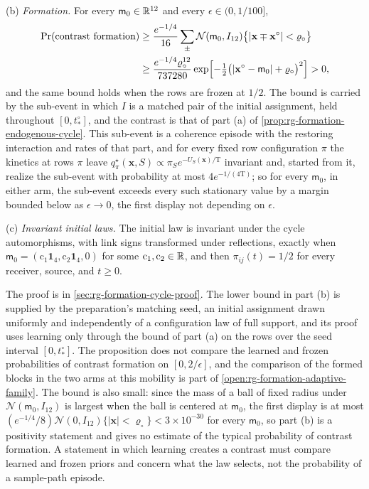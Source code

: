 (b) \emph{Formation.} For every \(\mathsf m_0\in\mathbb R^{12}\) and every
\(\epsilon\in(0,1/100]\),
\[
\begin{aligned}
\Pr(\text{contrast formation})
&\ge\frac{e^{-1/4}}{16}\sum_{\pm}\mathcal N(\mathsf m_0,I_{12})
\bigl\{|\mathbf x\mp\mathbf x^\circ|<\varrho_\circ\bigr\}\\
&\ge\frac{e^{-1/4}\varrho_\circ^{12}}{737280}
\exp\Bigl[-\tfrac12\bigl(|\mathbf x^\circ-\mathsf m_0|+\varrho_\circ\bigr)^2\Bigr]>0,
\end{aligned}
\]
and the same bound holds when the rows are frozen at \(1/2\). The bound is
carried by the sub-event in which \(I\) is a matched pair of the initial
assignment, held throughout \([0,t^\circ_*]\), and the contrast is that of
part (a) of \cref{prop:rg-formation-endogenous-cycle}. This sub-event is a
coherence episode with the restoring interaction and rates of that part, and
for every fixed row configuration \(\pi\) the kinetics at rows \(\pi\) leave
\(q^\star_\pi(\mathbf x,S)\propto\pi_Se^{-U_S(\mathbf x)/\mathrm T}\) invariant
and, started from it, realize the sub-event with probability at most
\(4e^{-1/(4\mathrm T)}\); so for every \(\mathsf m_0\), in either arm, the
sub-event exceeds every such stationary value by a margin bounded below as
\(\epsilon\to0\), the first display not depending on \(\epsilon\).

(c) \emph{Invariant initial laws.} The initial law is invariant under the cycle
automorphisms, with link signs transformed under reflections, exactly when
\(\mathsf m_0=(\mathrm c_1\mathbf 1_4,\mathrm c_2\mathbf 1_4,0)\) for some
\(\mathrm c_1,\mathrm c_2\in\mathbb R\), and then \(\pi_{ij}(t)=1/2\) for every
receiver, source, and \(t\ge0\).

The proof is in \cref{sec:rg-formation-cycle-proof}. The lower bound in part (b)
is supplied by the preparation's matching seed, an initial assignment drawn
uniformly and independently of a configuration law of full support, and its
proof uses learning only through the bound of part (a) on the rows over the
seed interval \([0,t^\circ_*]\). The proposition does not compare the learned
and frozen probabilities of contrast formation on \([0,2/\epsilon]\), and the
comparison of the formed blocks in the two arms at this mobility is part of
\cref{open:rg-formation-adaptive-family}. The bound is also small: since the
mass of a ball of fixed radius under \(\mathcal N(\mathsf m_0,I_{12})\) is
largest when the ball is centered at \(\mathsf m_0\), the first display is at
most \((e^{-1/4}/8)\mathcal N(0,I_{12})\{|\mathbf x|<\varrho_\circ\}<3\times10^{-30}\) for
every \(\mathsf m_0\), so part (b) is a positivity statement and gives no
estimate of the typical probability of contrast formation. A statement in
which learning creates a contrast must compare learned and frozen priors and concern what the law selects,
not the probability of a sample-path episode.

